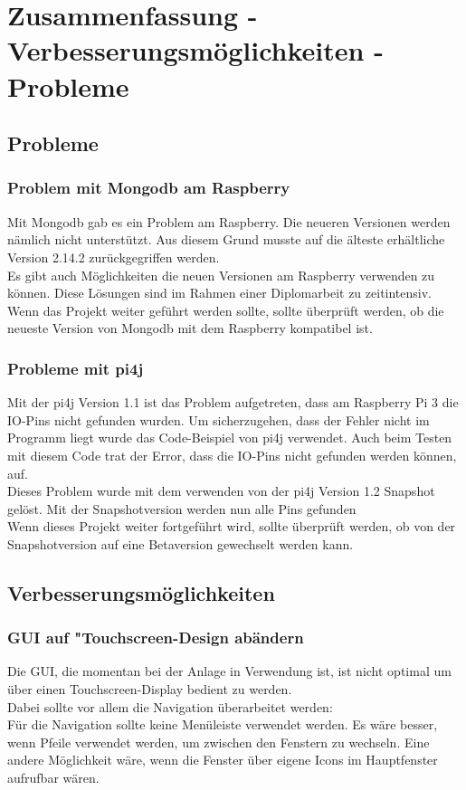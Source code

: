 \newpage

\section{Zusammenfassung - Verbesserungsmöglichkeiten - Probleme}

\subsection{Probleme}
\subsubsection{Problem mit Mongodb am Raspberry}
Mit Mongodb gab es ein Problem am Raspberry. Die neueren Versionen werden nämlich nicht unterstützt. Aus diesem Grund musste auf die älteste erhältliche Version 2.14.2 zurückgegriffen werden.
\\ Es gibt auch Möglichkeiten die neuen Versionen am Raspberry verwenden zu können. Diese Lösungen sind im Rahmen einer Diplomarbeit zu zeitintensiv.
\\ Wenn das Projekt weiter geführt werden sollte, sollte überprüft werden, ob die neueste Version von Mongodb mit dem Raspberry kompatibel ist.
\subsubsection{Probleme mit pi4j}
Mit der pi4j Version 1.1 ist das Problem aufgetreten, dass am Raspberry Pi 3 die IO-Pins nicht gefunden wurden. Um sicherzugehen, dass der Fehler nicht im Programm liegt wurde das Code-Beispiel von pi4j verwendet. Auch beim Testen mit diesem Code trat der Error, dass die IO-Pins nicht gefunden werden können, auf.
\\ Dieses Problem wurde mit dem verwenden von der pi4j Version 1.2 Snapshot gelöst. Mit der Snapshotversion werden nun alle Pins gefunden
\\ Wenn dieses Projekt weiter fortgeführt wird, sollte überprüft werden, ob von der Snapshotversion auf eine Betaversion gewechselt werden kann.

\subsection{Verbesserungsmöglichkeiten}
\subsubsection{GUI auf "Touchscreen-Design\grqq{} abändern}
Die GUI, die momentan bei der Anlage in Verwendung ist, ist nicht optimal um über einen Touchscreen-Display bedient zu werden.
\\ Dabei sollte vor allem die Navigation überarbeitet werden: 
\\Für die Navigation sollte keine Menüleiste verwendet werden. Es wäre besser, wenn Pfeile verwendet werden, um zwischen den Fenstern zu wechseln. Eine andere Möglichkeit wäre, wenn die Fenster über eigene Icons im Hauptfenster aufrufbar wären.
